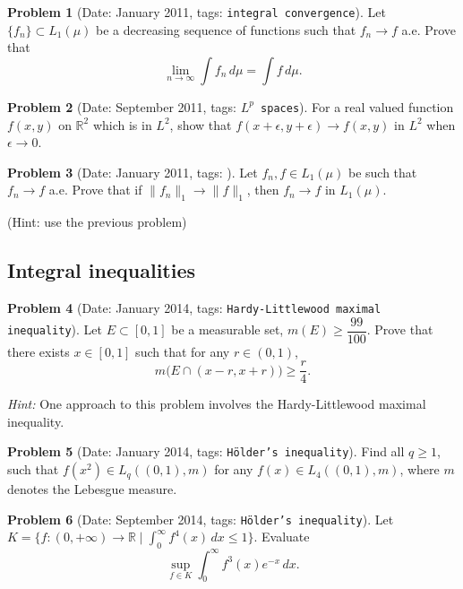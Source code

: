 \documentclass[11pt, notitlepage]{article}
\theoremstyle{definition}
\theoremstyle{definition}
\theoremstyle{definition}
\newtheorem{probstate}{Problem}
\theoremstyle{remark}
\newenvironment{problem}[2]{
    \begin{probstate}[Date: #1, tags: \texttt{#2}]
}
{
  \end{probstate}
}
\newcommand{\R}{\mathbb{R}}
\begin{document}
\begin{problem}{January 2011}{integral convergence}
  Let $\{f_n\} \subset L_1(\mu)$ be a decreasing sequence of functions such that $f_n \to f$ a.e.
  Prove that
    \[
      \lim_{n \to \infty} \int f_n \, d \mu = \int f \, d \mu.
    \]
\end{problem}

\begin{problem}{September 2011}{$L^p$ spaces}
  For a real valued function $f(x,y)$ on $\mathbb R^2$ which is in $L^2$, show that $f(x+\epsilon,y+\epsilon) \rightarrow f(x,y)$ in $L^2$ when $\epsilon \rightarrow 0$.
\end{problem}

\begin{problem}{January 2011}{}
  Let $f_n,f \in L_1(\mu)$ be such that $f_n \to f$ a.e.
    Prove that if \newline
    $\|f_n\|_1 \to \|f\|_1$,
    then $f_n \to f$ in $L_1(\mu)$.

    (Hint: use the previous problem)

\end{problem}

\subsection{Integral inequalities}

\begin{problem}{January 2014}{Hardy-Littlewood maximal inequality}
Let $E \subset [0,1]$ be a measurable set, $m(E) \ge \dfrac{99}{100}$. Prove that there exists $x \in [0,1]$ such that for any $r \in (0,1)$,
    \[
      m \big( E \cap (x-r,x+r) \big) \ge \frac{r}{4}.
    \]

\emph{Hint:} One approach to this problem involves the Hardy-Littlewood maximal inequality.
\end{problem}

\begin{problem}{January 2014}{H\"older's inequality}
Find all $q \ge 1$, such that $f(x^2) \in L_q((0,1),m)$ for any $f(x)  \in L_4((0,1),m)$, where $m$ denotes the Lebesgue measure.
\end{problem}

\begin{problem}{September 2014}{H\"older's inequality}
Let $K=\{f :(0,+\infty) \to \R \mid \int_0^{\infty} f^4(x) \, dx \le 1  \}$. Evaluate
\[
  \sup_{f \in K} \int_0^\infty f^3(x) e^{-x}  \, dx.
\]
\end{problem}
\end{document}
